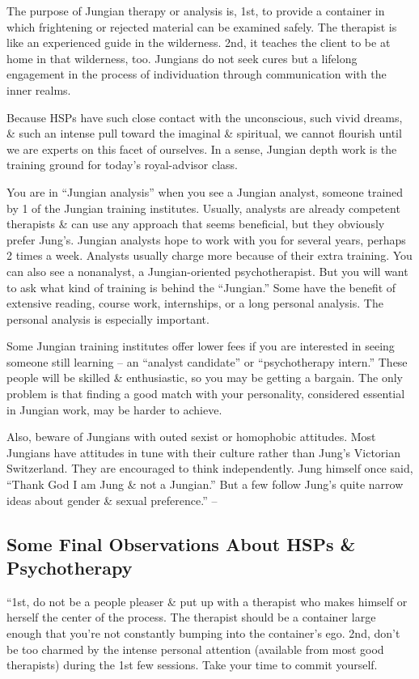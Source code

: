 \documentclass{article}
\numberwithin{equation}{section}
\begin{document}
The purpose of Jungian therapy or analysis is, 1st, to provide a container in which frightening or rejected material can be examined safely. The therapist is like an experienced guide in the wilderness. 2nd, it teaches the client to be at home in that wilderness, too. Jungians do not seek cures but a lifelong engagement in the process of individuation through communication with the inner realms.

Because HSPs have such close contact with the unconscious, such vivid dreams, \& such an intense pull toward the imaginal \& spiritual, we cannot flourish until we are experts on this facet of ourselves. In a sense, Jungian depth work is the training ground for today's royal-advisor class.

You are in ``Jungian analysis'' when you see a Jungian analyst, someone trained by 1 of the Jungian training institutes. Usually, analysts are already competent therapists \& can use any approach that seems beneficial, but they obviously prefer Jung's. Jungian analysts hope to work with you for several years, perhaps 2 times a week. Analysts usually charge more because of their extra training. You can also see a nonanalyst, a Jungian-oriented psychotherapist. But you will want to ask what kind of training is behind the ``Jungian.'' Some have the benefit of extensive reading, course work, internships, or a long personal analysis. The personal analysis is especially important.

Some Jungian training institutes offer lower fees if you are interested in seeing someone still learning -- an ``analyst candidate'' or ``psychotherapy intern.'' These people will be skilled \& enthusiastic, so you may be getting a bargain. The only problem is that finding a good match with your personality, considered essential in Jungian work, may be harder to achieve.

Also, beware of Jungians with outed sexist or homophobic attitudes. Most Jungians have attitudes in tune with their culture rather than Jung's Victorian Switzerland. They are encouraged to think independently. Jung himself once said, ``Thank God I am Jung \& not a Jungian.'' But a few follow Jung's quite narrow ideas about gender \& sexual preference.'' -- \cite[pp. 214--216]{Aron2013}

\subsection{Some Final Observations About HSPs \& Psychotherapy}
``1st, do not be a people pleaser \& put up with a therapist who makes himself or herself the center of the process. The therapist should be a container large enough that you're not constantly bumping into the container's ego. 2nd, don't be too charmed by the intense personal attention (available from most good therapists) during the 1st few sessions. Take your time to commit yourself.
\end{document}
